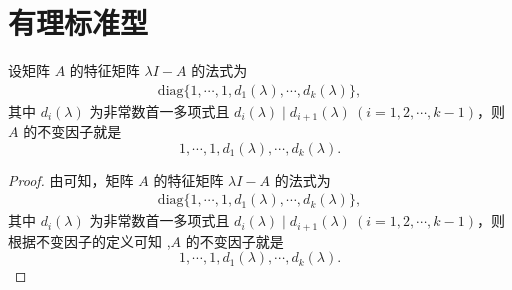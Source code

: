 \documentclass[../../main.tex]{subfiles}%
\begin{document}
\section{有理标准型}\label{section:有理标准型}

\begin{proposition}\label{proposition:特征矩阵的法式和不变因子}
设矩阵 $A$ 的特征矩阵 $\lambda I - A$ 的法式为
\begin{align*}
\mathrm{diag}\{1,\cdots,1,d_1(\lambda),\cdots,d_k(\lambda)\},
\end{align*}
其中 $d_i(\lambda)$ 为非常数首一多项式且 $d_i(\lambda)\mid d_{i + 1}(\lambda)\ (i = 1, 2, \cdots, k - 1)$，则 $A$ 的不变因子就是
\[
1,\cdots,1,d_1(\lambda),\cdots,d_k(\lambda).
\] 
\end{proposition}
\begin{proof}

由可知，矩阵 $A$ 的特征矩阵 $\lambda I - A$ 的法式为
\begin{align*}
\mathrm{diag}\{1,\cdots,1,d_1(\lambda),\cdots,d_k(\lambda)\},
\end{align*}
其中 $d_i(\lambda)$ 为非常数首一多项式且 $d_i(\lambda)\mid d_{i + 1}(\lambda)\ (i = 1, 2, \cdots, k - 1)$，则根据不变因子的定义可知 ,$A$ 的不变因子就是
\[
1,\cdots,1,d_1(\lambda),\cdots,d_k(\lambda).
\] 

\end{proof}
\end{document}
